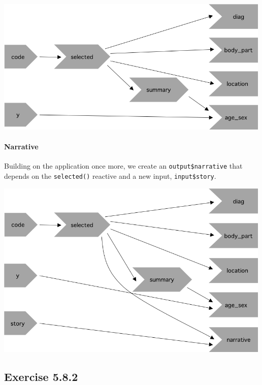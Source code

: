 \documentclass[]{book}
\let\oldparagraph\paragraph
\renewcommand{\paragraph}[1]{\oldparagraph{#1}\mbox{}}
\begin{document}
\begin{solution}
\includegraphics[width=5.20833in,height=\textheight]{images/5.8.1-ratecount.png}

\hypertarget{narrative}{%
\paragraph{Narrative}\label{narrative}}

Building on the application once more, we create an \texttt{output\$narrative} that
depends on the \texttt{selected()} reactive and a new input, \texttt{input\$story}.

\includegraphics[width=5.20833in,height=\textheight]{images/5.8.1-narrative.png}

\end{solution}

\hypertarget{exercise-5.8.2}{%
\subsection*{Exercise 5.8.2}\label{exercise-5.8.2}}
\end{document}
